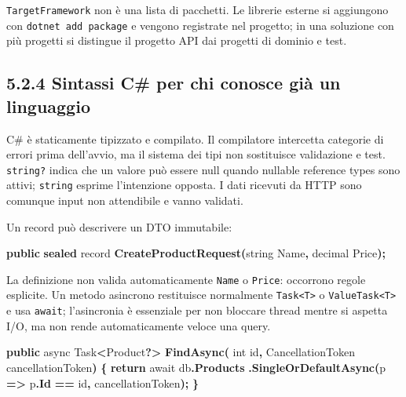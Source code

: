 \documentclass[
  italian,
  10pt,
]{book}
\newenvironment{Shaded}{\begin{snugshade}}{\end{snugshade}}
\newcommand{\DataTypeTok}[1]{\textcolor[rgb]{0.13,0.29,0.53}{#1}}
\newcommand{\FunctionTok}[1]{\textcolor[rgb]{0.13,0.29,0.53}{\textbf{#1}}}
\newcommand{\KeywordTok}[1]{\textcolor[rgb]{0.13,0.29,0.53}{\textbf{#1}}}
\newcommand{\NormalTok}[1]{#1}
\newcommand{\OperatorTok}[1]{\textcolor[rgb]{0.81,0.36,0.00}{\textbf{#1}}}
\begin{document}
\texttt{TargetFramework} non è una lista di pacchetti. Le librerie
esterne si aggiungono con \texttt{dotnet\ add\ package} e vengono
registrate nel progetto; in una soluzione con più progetti si distingue
il progetto API dai progetti di dominio e test.

\subsection{5.2.4 Sintassi C\# per chi conosce già un
linguaggio}\label{sintassi-c-per-chi-conosce-giuxe0-un-linguaggio}

C\# è staticamente tipizzato e compilato. Il compilatore intercetta
categorie di errori prima dell'avvio, ma il sistema dei tipi non
sostituisce validazione e test. \texttt{string?} indica che un valore
può essere null quando nullable reference types sono attivi;
\texttt{string} esprime l'intenzione opposta. I dati ricevuti da HTTP
sono comunque input non attendibile e vanno validati.

Un record può descrivere un DTO immutabile:

\begin{Shaded}
\begin{Highlighting}[]
\KeywordTok{public} \KeywordTok{sealed}\NormalTok{ record }\FunctionTok{CreateProductRequest}\OperatorTok{(}\DataTypeTok{string}\NormalTok{ Name}\OperatorTok{,} \DataTypeTok{decimal}\NormalTok{ Price}\OperatorTok{);}
\end{Highlighting}
\end{Shaded}

La definizione non valida automaticamente \texttt{Name} o
\texttt{Price}: occorrono regole esplicite. Un metodo asincrono
restituisce normalmente \texttt{Task\textless{}T\textgreater{}} o
\texttt{ValueTask\textless{}T\textgreater{}} e usa \texttt{await};
l'asincronia è essenziale per non bloccare thread mentre si aspetta I/O,
ma non rende automaticamente veloce una query.

\begin{Shaded}
\begin{Highlighting}[]
\KeywordTok{public}\NormalTok{ async Task}\OperatorTok{\textless{}}\NormalTok{Product}\OperatorTok{?\textgreater{}} \FunctionTok{FindAsync}\OperatorTok{(}
    \DataTypeTok{int}\NormalTok{ id}\OperatorTok{,}\NormalTok{ CancellationToken cancellationToken}\OperatorTok{)}
\OperatorTok{\{}
    \KeywordTok{return}\NormalTok{ await db}\OperatorTok{.}\FunctionTok{Products}
        \OperatorTok{.}\FunctionTok{SingleOrDefaultAsync}\OperatorTok{(}\NormalTok{p }\OperatorTok{=\textgreater{}}\NormalTok{ p}\OperatorTok{.}\FunctionTok{Id} \OperatorTok{==}\NormalTok{ id}\OperatorTok{,}\NormalTok{ cancellationToken}\OperatorTok{);}
\OperatorTok{\}}
\end{Highlighting}
\end{Shaded}
\end{document}

